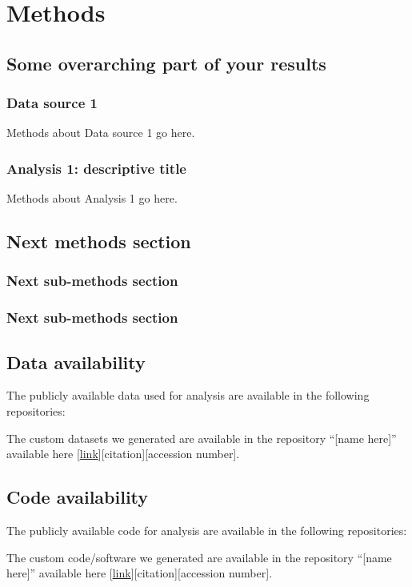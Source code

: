 \section{Methods}
\methodsTips %

\subsection{Some overarching part of your results}
\subsubsection*{Data source 1}
Methods about Data source 1 go here.
\methodsDataTips

\subsubsection*{Analysis 1: descriptive title}
Methods about Analysis 1 go here.
\methodsAnalysisTips

\subsection{Next methods section}
\subsubsection*{Next sub-methods section}
\subsubsection*{Next sub-methods section}


\subsection{Data availability}
The publicly available data used for analysis are available in the following repositories:

The custom datasets we generated are available in the repository “[name here]” available here [\url{link}][citation][accession number].

\subsection{Code availability}
The publicly available code for analysis are available in the following repositories: 

The custom code/software we generated are available in the repository “[name here]” available here [\url{link}][citation][accession number].

